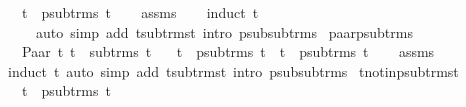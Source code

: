 \begin{isabellebody}
\ \ \ {\isachardoublequoteopen}t{}\ {\isasymin}\ psub{\isacharunderscore}{\kern0pt}trms\ t{}{\isachardoublequoteclose}\isanewline
%
\isadelimproof
\ \ %
\endisadelimproof
%
\isatagproof
{}\isamarkupfalse%
\ assms\isanewline
\ \ \isamarkupfalse%
\ {\isacharparenleft}{\kern0pt}induct\ t{}{\isacharparenright}{\kern0pt}\isanewline
\ \ \ \ \ {\isacharparenleft}{\kern0pt}auto\ simp\ add{\isacharcolon}{\kern0pt}\ t{\isacharunderscore}{\kern0pt}sub{\isacharunderscore}{\kern0pt}trms{\isacharunderscore}{\kern0pt}t\ intro{\isacharcolon}{\kern0pt}\ psub{\isacharunderscore}{\kern0pt}sub{\isacharunderscore}{\kern0pt}trms{\isacharparenright}{\kern0pt}%
\endisatagproof
{\isafoldproof}%
%
\isadelimproof
\isanewline
%
\endisadelimproof
\isanewline
{}\isamarkupfalse%
\ paar{\isacharunderscore}{\kern0pt}psub{\isacharunderscore}{\kern0pt}trms{\isacharcolon}{\kern0pt}\ \isanewline
\ \ \ {\isachardoublequoteopen}Paar\ t{}\ t{}\ {\isasymin}\ sub{\isacharunderscore}{\kern0pt}trms\ t{}{\isachardoublequoteclose}\isanewline
\ \ \ {\isachardoublequoteopen}t{}\ {\isasymin}\ psub{\isacharunderscore}{\kern0pt}trms\ t{}{\isachardoublequoteclose}\ \ {\isachardoublequoteopen}t{}\ {\isasymin}\ psub{\isacharunderscore}{\kern0pt}trms\ t{}{\isachardoublequoteclose}\isanewline
%
\isadelimproof
\ \ %
\endisadelimproof
%
\isatagproof
{}\isamarkupfalse%
\ assms\isanewline
\ \ \isamarkupfalse%
\ {\isacharparenleft}{\kern0pt}induct\ t{}{\isacharparenright}{\kern0pt}\ {\isacharparenleft}{\kern0pt}auto\ simp\ add{\isacharcolon}{\kern0pt}\ t{\isacharunderscore}{\kern0pt}sub{\isacharunderscore}{\kern0pt}trms{\isacharunderscore}{\kern0pt}t\ intro{\isacharcolon}{\kern0pt}\ psub{\isacharunderscore}{\kern0pt}sub{\isacharunderscore}{\kern0pt}trms{\isacharparenright}{\kern0pt}%
\endisatagproof
{\isafoldproof}%
%
\isadelimproof
\isanewline
%
\endisadelimproof
\isanewline
{}\isamarkupfalse%
\ t{\isacharunderscore}{\kern0pt}not{\isacharunderscore}{\kern0pt}in{\isacharunderscore}{\kern0pt}psub{\isacharunderscore}{\kern0pt}trms{\isacharunderscore}{\kern0pt}t{\isacharcolon}{\kern0pt}\ \isanewline
\ \ \ {\isachardoublequoteopen}t\ {\isasymnotin}\ psub{\isacharunderscore}{\kern0pt}trms\ t{\isachardoublequoteclose}\isanewline
%
\isadelimproof
%
\endisadelimproof
%
\isatagproof

\end{isabellebody}
